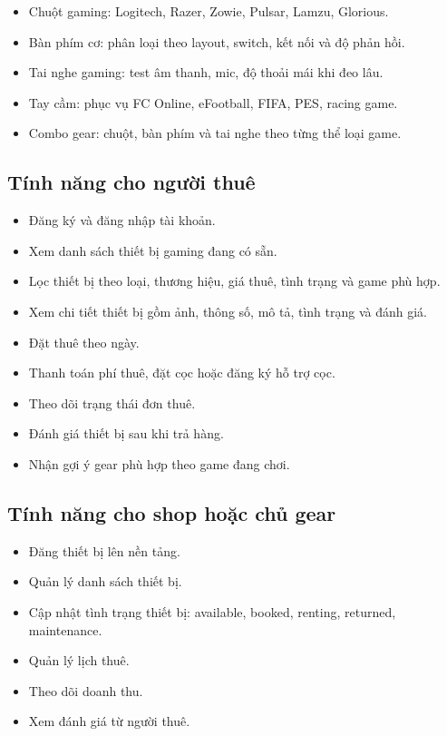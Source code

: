 \begin{itemize}
    \item Chuột gaming: Logitech, Razer, Zowie, Pulsar, Lamzu, Glorious.
    \item Bàn phím cơ: phân loại theo layout, switch, kết nối và độ phản hồi.
    \item Tai nghe gaming: test âm thanh, mic, độ thoải mái khi đeo lâu.
    \item Tay cầm: phục vụ FC Online, eFootball, FIFA, PES, racing game.
    \item Combo gear: chuột, bàn phím và tai nghe theo từng thể loại game.
\end{itemize}

\subsection{Tính năng cho người thuê}

\begin{itemize}
    \item Đăng ký và đăng nhập tài khoản.
    \item Xem danh sách thiết bị gaming đang có sẵn.
    \item Lọc thiết bị theo loại, thương hiệu, giá thuê, tình trạng và game phù hợp.
    \item Xem chi tiết thiết bị gồm ảnh, thông số, mô tả, tình trạng và đánh giá.
    \item Đặt thuê theo ngày.
    \item Thanh toán phí thuê, đặt cọc hoặc đăng ký hỗ trợ cọc.
    \item Theo dõi trạng thái đơn thuê.
    \item Đánh giá thiết bị sau khi trả hàng.
    \item Nhận gợi ý gear phù hợp theo game đang chơi.
\end{itemize}

\subsection{Tính năng cho shop hoặc chủ gear}

\begin{itemize}
    \item Đăng thiết bị lên nền tảng.
    \item Quản lý danh sách thiết bị.
    \item Cập nhật tình trạng thiết bị: available, booked, renting, returned, maintenance.
    \item Quản lý lịch thuê.
    \item Theo dõi doanh thu.
    \item Xem đánh giá từ người thuê.
\end{itemize}

